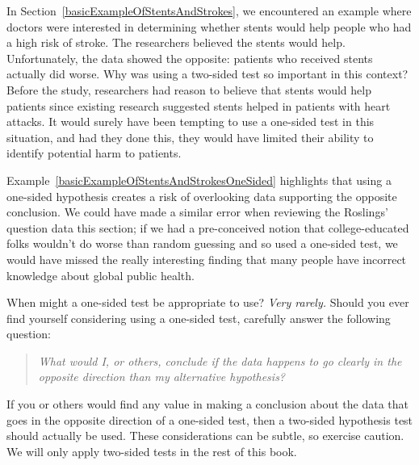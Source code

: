 \begin{examplewrap}
\begin{nexample}{
    In Section~\ref{basicExampleOfStentsAndStrokes},
    we encountered an example where doctors were interested
    in determining whether stents would help people who had
    a high risk of stroke.
    The researchers believed the stents would help.
    Unfortunately, the data showed the opposite:
    patients who received stents actually did worse.
    Why was using a two-sided test so important in
    this context?}
    \label{basicExampleOfStentsAndStrokesOneSided}
  Before the study, researchers had reason to believe
  that stents would help patients since existing research
  suggested stents helped in patients with heart attacks.
  It would surely have been tempting to use a one-sided
  test in this situation, and had they done this,
  they would have limited their ability to identify
  potential harm to patients.
\end{nexample}
\end{examplewrap}

Example~\ref{basicExampleOfStentsAndStrokesOneSided}
highlights that using a one-sided hypothesis creates
a risk of overlooking data supporting the opposite
conclusion.
We could have made a similar error when reviewing
the Roslings' question data this section;
if we had a pre-conceived notion that
college-educated folks wouldn't do worse than random
guessing and so used a one-sided test,
we would have missed the really interesting finding
that many people have incorrect knowledge about
global public health.
%    

When might a one-sided test be appropriate to use?
\emph{Very rarely.}
Should you ever find yourself considering using a
one-sided test, carefully answer the following question:
\begin{quote}{\em
  What would I, or others, conclude if the data happens
  to go clearly in the opposite direction than my
  alternative hypothesis?
}\end{quote}
If you or others would find any value in making
a conclusion about the data that goes in the opposite
direction of a one-sided test, then a two-sided hypothesis
test should actually be used.
These considerations can be subtle, so exercise caution.
We will only apply two-sided tests in the rest of
this book. 

